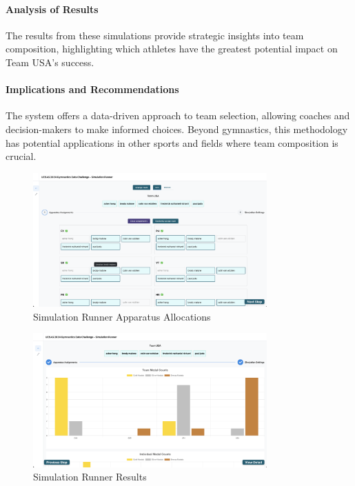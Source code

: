 \documentclass{article}
\begin{document}
\paragraph{Analysis of Results}
The results from these simulations provide strategic insights into team composition, highlighting which athletes have the greatest potential impact on Team USA's success.

\paragraph{Implications and Recommendations}
The system offers a data-driven approach to team selection, allowing coaches and decision-makers to make informed choices. Beyond gymnastics, this methodology has potential applications in other sports and fields where team composition is crucial.


\begin{figure}[H]
    \centering
    \includegraphics[width=0.8\textwidth]{./simulation_runner.png}
    \caption{Simulation Runner Apparatus Allocations}
    \label{fig:sim_runner}
\end{figure}

\begin{figure}[H]
    \centering
    \includegraphics[width=0.8\textwidth]{./results_viewer.png}
    \caption{Simulation Runner Results}
    \label{fig:sim_results}
\end{figure}
\end{document}
